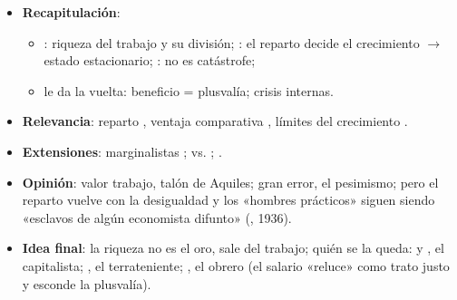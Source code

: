 \documentclass{article}
\begin{document}
\begin{columnas}
\begin{itemize}
\item \textbf{Recapitulación}:
  \begin{itemize}
  \item {}: riqueza del trabajo y su división; : el reparto decide el crecimiento $\to$ estado estacionario; : no es catástrofe;
  \item {} le da la vuelta: beneficio = plusvalía; crisis internas.
  \end{itemize}
\item \textbf{Relevancia}: reparto , ventaja comparativa , límites del crecimiento .
\item \textbf{Extensiones}: marginalistas ;  vs.  ; .
\item \textbf{Opinión}: valor trabajo, talón de Aquiles; gran error, el pesimismo; pero el reparto vuelve con la desigualdad y los «hombres prácticos» siguen siendo «esclavos de algún economista difunto» (, 1936).
\item \textbf{Idea final}: la riqueza no es el oro, sale del trabajo; quién se la queda:  y , el capitalista; , el terrateniente; , el obrero (el salario «reluce» como trato justo y esconde la plusvalía).
\end{itemize}


\end{columnas}
\end{document}
